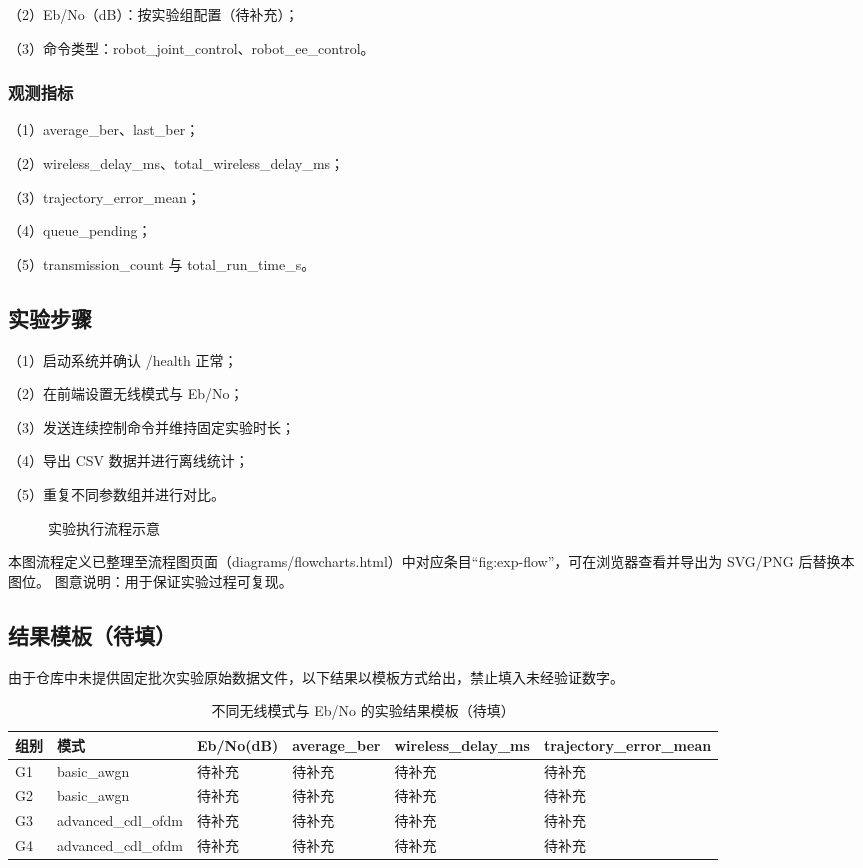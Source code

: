 （2）Eb/No（dB）：按实验组配置（待补充）；

（3）命令类型：robot\_joint\_control、robot\_ee\_control。

\subsubsection{观测指标}
（1）average\_ber、last\_ber；

（2）wireless\_delay\_ms、total\_wireless\_delay\_ms；

（3）trajectory\_error\_mean；

（4）queue\_pending；

（5）transmission\_count 与 total\_run\_time\_s。

\subsection{实验步骤}
（1）启动系统并确认 /health 正常；

（2）在前端设置无线模式与 Eb/No；

（3）发送连续控制命令并维持固定实验时长；

（4）导出 CSV 数据并进行离线统计；

（5）重复不同参数组并进行对比。

\begin{figure}[htbp]
\centering
{}
\caption{实验执行流程示意}
\label{fig:exp-flow}
\end{figure}

\noindent 本图流程定义已整理至流程图页面（diagrams/flowcharts.html）中对应条目“fig:exp-flow”，可在浏览器查看并导出为 SVG/PNG 后替换本图位。
\noindent 图意说明：用于保证实验过程可复现。

\subsection{结果模板（待填）}
由于仓库中未提供固定批次实验原始数据文件，以下结果以模板方式给出，禁止填入未经验证数字。

\begin{table}[htbp]
\centering
\caption{不同无线模式与 Eb/No 的实验结果模板（待填）}
\label{tab:exp-result-template}
\begin{tabular}{llllll}
\hline
组别 & 模式 & Eb/No(dB) & average\_ber & wireless\_delay\_ms & trajectory\_error\_mean \\
\hline
G1 & basic\_awgn & 待补充 & 待补充 & 待补充 & 待补充 \\
G2 & basic\_awgn & 待补充 & 待补充 & 待补充 & 待补充 \\
G3 & advanced\_cdl\_ofdm & 待补充 & 待补充 & 待补充 & 待补充 \\
G4 & advanced\_cdl\_ofdm & 待补充 & 待补充 & 待补充 & 待补充 \\
\hline
\end{tabular}
\end{table}

